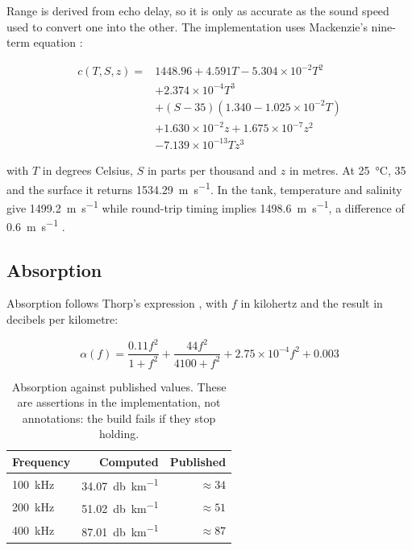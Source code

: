 \documentclass[conference,a4paper]{IEEEtran}
\begin{document}
Range is derived from echo delay, so it is only as accurate as the sound speed
used to convert one into the other. The implementation uses Mackenzie's
nine-term equation \cite{mackenzie1981}:

\begin{equation}
\begin{split}
c(T,S,z) ={}& 1448.96 + 4.591T - 5.304\times10^{-2}T^{2} \\
             & + 2.374\times10^{-4}T^{3} \\
             & + (S-35)(1.340 - 1.025\times10^{-2}T) \\
             & + 1.630\times10^{-2}z + 1.675\times10^{-7}z^{2} \\
             & - 7.139\times10^{-13}Tz^{3}
\end{split}
\label{eq:mackenzie}
\end{equation}

with $T$ in degrees Celsius, $S$ in parts per thousand and $z$ in metres. At
\SI{25}{\celsius}, \SI{35}{\ppt} and the surface it returns
\SI{1534.29}{\metre\per\second}. In the tank, temperature and salinity give
\SI{1499.2}{\metre\per\second} while round-trip timing implies
\SI{1498.6}{\metre\per\second}, a difference of
\SI{0.6}{\metre\per\second} .

\subsection{Absorption}

Absorption follows Thorp's expression \cite{thorp1967}, with $f$ in kilohertz
and the result in decibels per kilometre:

\begin{equation}
\alpha(f) = \frac{0.11f^{2}}{1+f^{2}} + \frac{44f^{2}}{4100+f^{2}}
          + 2.75\times10^{-4}f^{2} + 0.003
\label{eq:thorp}
\end{equation}

\begin{table}[t]
\centering
\small
\begin{tabular}{lrr}
\toprule
\textbf{Frequency} & \textbf{Computed} & \textbf{Published} \\
\midrule
\SI{100}{\kilo\hertz} & \SI{34.07}{\decibel\per\kilo\metre} & $\approx 34$ \\
\SI{200}{\kilo\hertz} & \SI{51.02}{\decibel\per\kilo\metre} & $\approx 51$ \\
\SI{400}{\kilo\hertz} & \SI{87.01}{\decibel\per\kilo\metre} & $\approx 87$ \\
\bottomrule
\end{tabular}
\caption{Absorption against published values. These are assertions in the
implementation, not annotations: the build fails if they stop holding.}
\end{table}
\end{document}

